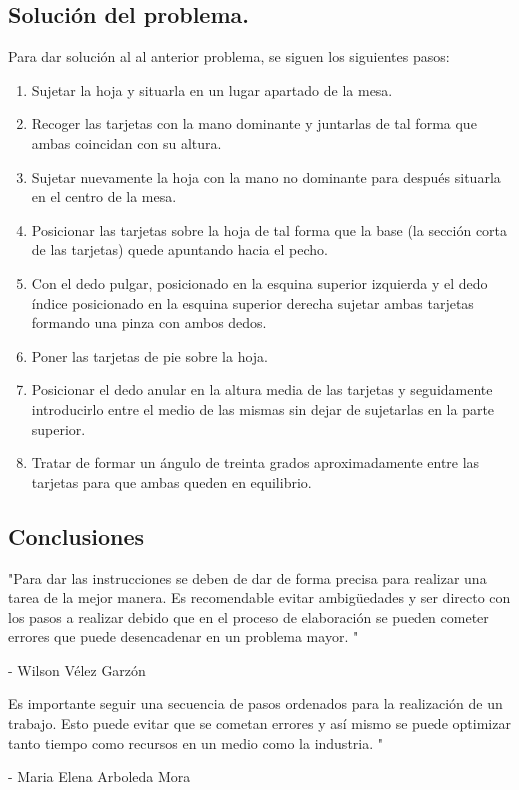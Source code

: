 \documentclass{article}
\begin{document}
\subsection{Solución del problema.}
Para dar solución al al anterior problema, se siguen los siguientes pasos: 


\begin{enumerate}
\item Sujetar la hoja y situarla en un lugar apartado de la mesa. 
\item Recoger las tarjetas con la mano dominante y         juntarlas de tal forma que ambas coincidan con su altura. 
\item 	Sujetar nuevamente la hoja con la mano no dominante para después situarla en el centro de la mesa.
\item  Posicionar las tarjetas sobre la hoja de tal forma que la base (la sección corta de las tarjetas) quede apuntando hacia el pecho. 
\item Con el dedo pulgar, posicionado en la esquina superior izquierda y el dedo índice posicionado en la esquina superior derecha sujetar ambas tarjetas formando una pinza con ambos dedos. 
\item 	 Poner las tarjetas de pie sobre la hoja.
\item Posicionar el dedo anular en la altura media de las tarjetas y seguidamente introducirlo entre el medio de las mismas sin dejar de sujetarlas en la parte superior.
\item 	Tratar de formar un ángulo de treinta grados aproximadamente entre las tarjetas para que ambas queden en equilibrio. 
\end{enumerate}
\subsection{Conclusiones}
"Para dar las instrucciones se deben de dar de forma precisa para realizar una tarea de la mejor manera. Es recomendable evitar ambigüedades y ser directo con los pasos a realizar debido que en el proceso de  elaboración  se pueden cometer errores que puede desencadenar en un problema mayor. "

- Wilson Vélez Garzón


Es importante seguir una secuencia de pasos ordenados para la realización de un trabajo. Esto puede evitar que se cometan errores y así mismo se puede optimizar tanto tiempo como recursos en un medio como la industria. "


- Maria Elena Arboleda Mora
\end{document}
